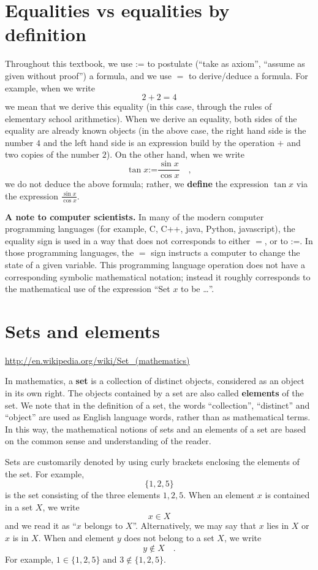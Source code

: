 \documentclass[12pt]{book}
\newcommand{\eqdef}{\textbf{:=}}
\renewcommand{\emph}{\textbf}
\begin{document}
\section{Equalities vs equalities by definition }
Throughout this textbook, we use $\eqdef$ to postulate (``take as axiom'', ``assume as given without proof'') a formula, and we use $=$ to derive/deduce a formula. For example, when we write 
\[ 2+2=4
\]
we mean that we derive this equality (in this case, through the rules of elementary school arithmetics). When we derive an equality, both sides of the equality are already known objects (in the above case, the right hand side is the number $4$ and the left hand side is an expression build by the operation $+$ and two copies of the number $2$).  On the other hand, when we write 
\[
\tan x\eqdef\frac{\sin x}{\cos x}\quad ,
\]
we do not deduce the above formula; rather, we \emph{define} the expression $\tan x$ via the expression $\displaystyle\frac{\sin x}{\cos x}$.

\textbf{A note to computer scientists. } In many of the modern computer programming languages (for example, C, C++, java, Python, javascript), the equality sign is used in a way that does not corresponds to either $=$, or to $\eqdef$. In those programming languages, the $=$ sign instructs a computer to change the state of a given variable. This programming language operation does not have a corresponding symbolic mathematical notation; instead it roughly corresponds to the mathematical use of the expression ``Set $x$ to be \dots ''.
\section{Sets and elements}
\url{http://en.wikipedia.org/wiki/Set_(mathematics)}

In mathematics, a \emph{set} is a collection of distinct objects, considered as an object in its own right. The objects contained by a set are also called \emph{elements} of the set. We note that in the definition of a set, the words ``collection'', ``distinct'' and ``object'' are used as English language words, rather than as mathematical terms. In this way, the mathematical notions of sets and an elements of a set are based on the common sense and understanding of the reader. 

Sets are customarily denoted by using curly brackets enclosing the elements of the set. For example,
\[
\{1,2,5\}
\]
is the set consisting of the three elements $1,2,5$. When an element $x$ is contained in a set $X$, we write 
\[
x\in X
\]
and we read it as ``$x$ belongs to $X$''. Alternatively, we may say that $x$ lies in $X$ or $x$ is in $X$. When and element $y$ does not belong to a set $X$, we write 
\[
y\notin X\quad. 
\]
For example, $1\in \{1,2,5\}$ and $3\notin \{1,2,5\}$.
\end{document}

